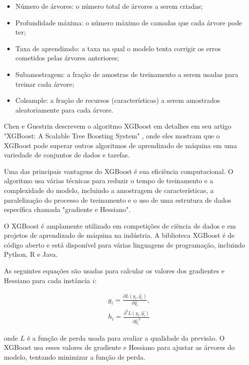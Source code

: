\begin{itemize}
    \item Número de árvores: o número total de árvores a serem criadas;
    \item Profundidade máxima: o número máximo de camadas que cada árvore pode ter;
    \item Taxa de aprendizado: a taxa na qual o modelo tenta corrigir os erros cometidos pelas árvores anteriores;
    \item Subamostragem: a fração de amostras de treinamento a serem usadas para treinar cada árvore;
    \item Colsample: a fração de recursos (características) a serem amostrados aleatoriamente para cada árvore.
\end{itemize}

Chen e Guestrin descrevem o algoritmo XGBoost em detalhes em seu artigo "XGBoost: A Scalable Tree Boosting System" \citep{Chen:2016}, onde eles mostram que o XGBoost pode superar outros algoritmos de aprendizado de máquina em uma variedade de conjuntos de dados e tarefas.

Uma das principais vantagens do XGBoost é sua eficiência computacional. O algoritmo usa várias técnicas para reduzir o tempo de treinamento e a complexidade do modelo, incluindo a amostragem de características, a paralelização do processo de treinamento e o uso de uma estrutura de dados específica chamada "gradiente e Hessiano".

O XGBoost é amplamente utilizado em competições de ciência de dados e em projetos de aprendizado de máquina na indústria. A biblioteca XGBoost é de código aberto e está disponível para várias linguagens de programação, incluindo Python, R e Java.

As seguintes equações são usadas para calcular os valores dos gradientes e Hessiano para cada instância $i$:

\begin{equation}
    \begin{aligned}
         & g_i = \frac{\partial L (y_i, \hat{y_i})}{\partial \hat{y_i}},      \\
         & h_i = \frac{\partial^2 L (y_i, \hat{y_i})}{\partial \hat{y_{i}}^2}
    \end{aligned}
\end{equation}


onde $L$ é a função de perda usada para avaliar a qualidade da previsão. O XGBoost usa esses valores de gradiente e Hessiano para ajustar as árvores do modelo, tentando minimizar a função de perda.